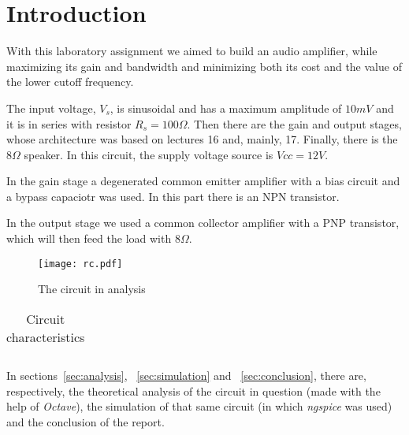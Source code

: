\section{Introduction}
\label {sec:introduction}


With this laboratory assignment we aimed to build an audio amplifier, while maximizing its gain and bandwidth and minimizing both its cost and the value of the lower cutoff frequency.

The input voltage, $V_s$, is sinusoidal and has a maximum amplitude of $10 mV$ and it is in series with resistor $R_s=100 \Omega$. Then there are the gain and output stages, whose architecture was based on lectures 16 and, mainly, 17. Finally, there is the $8 \Omega$ speaker. In this circuit, the supply voltage source is $Vcc=12 V$.

In the gain stage a degenerated common emitter amplifier with a bias circuit and a bypass capaciotr was used. In this part there is an NPN transistor.

In the output stage we used a common collector amplifier with a PNP transistor, which will then feed the load with $8 \Omega$.



\begin{figure}[H] \centering
\texttt{[image: rc.pdf]}
\caption{The circuit in analysis}
\label{fig:circuit}
\end{figure}


\begin{table}[H]
  \centering
  \begin{tabular}{|c|c|}
    \hline
      
  \end{tabular}
  \caption{Circuit characteristics}
  \label{tab:resistance}
\end{table}

In sections~\ref{sec:analysis}, ~\ref{sec:simulation} and ~\ref{sec:conclusion}, there are, respectively, the theoretical analysis of the circuit in question (made with the help of \textit{Octave}), the simulation of that same circuit (in which \textit{ngspice} was used) and the conclusion of the report.
